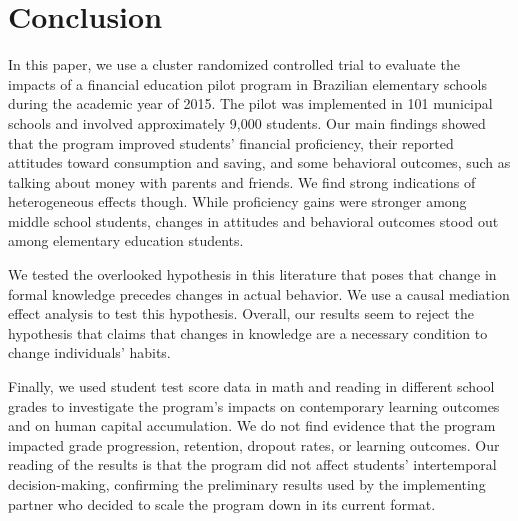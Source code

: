 \section{Conclusion} \label{sec:conclusion}

In this paper, we use a cluster randomized controlled trial to evaluate the impacts of a financial education pilot program in Brazilian elementary schools during the academic year of 2015. The pilot was implemented in 101 municipal schools and involved approximately 9,000 students. Our main findings showed that the program improved students' financial proficiency, their reported attitudes toward consumption and saving, and some behavioral outcomes, such as talking about money with parents and friends. We find strong indications of heterogeneous effects though. While proficiency gains were stronger among middle school students, changes in attitudes and behavioral outcomes stood out among elementary education students. 

We tested the overlooked hypothesis in this literature that poses that change in formal knowledge precedes changes in actual behavior. We use a causal mediation effect analysis to test this hypothesis. Overall, our results seem to reject the hypothesis that claims that changes in knowledge are a necessary condition to change individuals' habits. 

Finally, we used student test score data in math and reading in different school grades to investigate the program's impacts on contemporary learning outcomes and on human capital accumulation. We do not find evidence that the program impacted grade progression, retention, dropout rates, or learning outcomes. Our reading of the results is that the program did not affect students' intertemporal decision-making, confirming the preliminary results used by the implementing partner who decided to scale the program down in its current format. 

